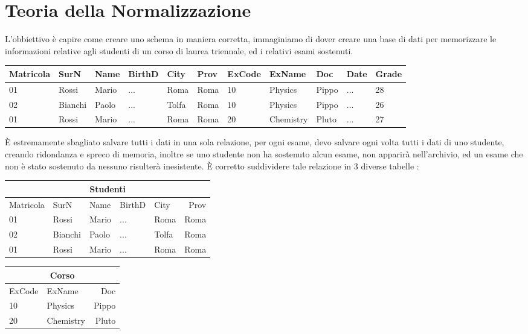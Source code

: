 \documentclass[12pt, letterpaper]{article}
\begin{document}
\section{Teoria della Normalizzazione}\label{Cap4}
L'obbiettivo è capire come creare uno schema in maniera corretta, immaginiamo di dover creare 
una base di dati per memorizzare le informazioni relative agli studenti di un corso di laurea 
triennale, ed i relativi esami sostenuti.\begin{center}
    \begin{tabular}{|l|l|l|l|l|l|l|l|l|l|l|}
        \hline
        Matricola  & SurN & Name & BirthD & City & Prov & ExCode & ExName & Doc & Date & Grade \\ \hline
        01  & Rossi & Mario & ... & Roma & Roma & 10 & Physics & Pippo & ... & 28 \\ \hline
        02  & Bianchi & Paolo & ... & Tolfa & Roma & 10 & Physics & Pippo & ... & 26 \\ \hline
        01  & Rossi & Mario & ... & Roma & Roma & 20 & Chemistry & Pluto & ... & 27 \\ \hline
        \end{tabular}
\end{center}
È estremamente sbagliato salvare tutti i dati in una sola relazione, per ogni esame, devo salvare 
ogni volta tutti i dati di uno studente, creando ridondanza e spreco di memoria, inoltre se uno studente
non ha sostenuto alcun esame, non apparirà nell'archivio, ed un esame che non è stato sostenuto da 
nessuno risulterà inesistente. È corretto suddividere tale relazione in 3 diverse tabelle :
\begin{center}
    \begin{tabular}{|l|l|l|l|l|r|}
        \hline
        \multicolumn{6}{|c|}{Studenti}   \\\hline
        Matricola  & SurN & Name & BirthD & City & Prov  \\ \hline
        01  & Rossi & Mario & ... & Roma & Roma \\ \hline
        02  & Bianchi & Paolo & ... & Tolfa & Roma  \\ \hline
        01  & Rossi & Mario & ... & Roma & Roma  \\ \hline
        \end{tabular}
        \begin{tabular}{|l|l|r|}
            \hline
            \multicolumn{3}{|c|}{Corso}   \\\hline
            ExCode  & ExName & Doc  \\ \hline
            10  & Physics & Pippo \\ \hline
            20  & Chemistry & Pluto\\ \hline
            \end{tabular}
\end{center}
\end{document}

